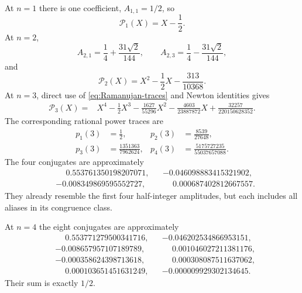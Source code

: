 \documentclass[11pt,oneside]{article}
\theoremstyle{definition}
\theoremstyle{remark}
\begin{document}
At $n=1$ there is one coefficient, $A_{1,1}=1/2$, so
\begin{equation}\label{eq:P1-poly}
 \mathcal P_1(X)=X-\frac12.
\end{equation}
At $n=2$,
\begin{equation}\label{eq:A2-values}
 A_{2,1}=\frac14+\frac{31\sqrt2}{144},
 \qquad
 A_{2,3}=\frac14-\frac{31\sqrt2}{144},
\end{equation}
and
\begin{equation}\label{eq:P2-poly}
 \boxed{
 \mathcal P_2(X)=X^2-\frac12X-\frac{313}{10368}.}
\end{equation}
At $n=3$, direct use of \eqref{eq:Ramanujan-traces} and Newton identities gives
\begin{equation}\label{eq:P3-poly}
\boxed{
\begin{aligned}
 \mathcal P_3(X)={}&X^4-\frac12X^3
 -\frac{1627}{55296}X^2
 -\frac{4603}{23887872}X
 +\frac{32257}{220150628352}.
\end{aligned}}
\end{equation}
The corresponding rational power traces are
\begin{align}
 p_1(3)&=\frac12,
 &p_2(3)&=\frac{8539}{27648},
 \label{eq:p3-12}\\
 p_3(3)&=\frac{1351363}{7962624},
 &p_4(3)&=\frac{5175727235}{55037657088}.
 \label{eq:p3-34}
\end{align}
The four conjugates are approximately
\begin{equation}\label{eq:n3-conjugates}
\begin{aligned}
 &\phantom{-}0.553761350198207071,
 &&-0.046098883415321902,\\
 &-0.008349869595552727,
 &&\phantom{-}0.000687402812667557.
\end{aligned}
\end{equation}
They already resemble the first four half-integer amplitudes, but each includes
all aliases in its congruence class.

At $n=4$ the eight conjugates are approximately
\begin{align*}
 &\phantom{-}0.553771279500341716,
 &&-0.046202534866953151,\\
 &-0.008657957107189789,
 &&\phantom{-}0.001046027211381176,\\
 &-0.000358624398713618,
 &&\phantom{-}0.000308087511637062,\\
 &\phantom{-}0.000103651451631249,
 &&-0.000009929302134645.
\end{align*}
Their sum is exactly $1/2$.
\end{document}
